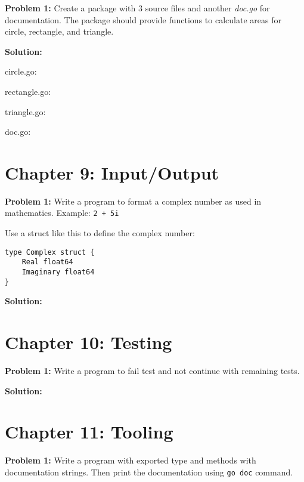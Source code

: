 {\bf Problem 1:} Create a package with 3 source files and
another \textit{doc.go} for documentation.  The package should provide
functions to calculate areas for circle, rectangle, and triangle.

\textbf{Solution:}

circle.go:



rectangle.go:



triangle.go:



doc.go:



\section*{Chapter 9: Input/Output}

\textbf{Problem 1:} Write a program to format a complex number as used in mathematics.  Example: \texttt{2 + 5i}

Use a struct like this to define the complex number:

\begin{lstlisting}[numbers=none]
type Complex struct {
    Real float64
    Imaginary float64
}
\end{lstlisting}

\textbf{Solution:}



\section*{Chapter 10: Testing}

\textbf{Problem 1:} Write a program to fail test and not continue with remaining tests.

\textbf{Solution:}



\section*{Chapter 11: Tooling}

{\bfseries Problem 1:} Write a program with exported type and methods
with documentation strings.  Then print the documentation
using \texttt{go doc} command.

